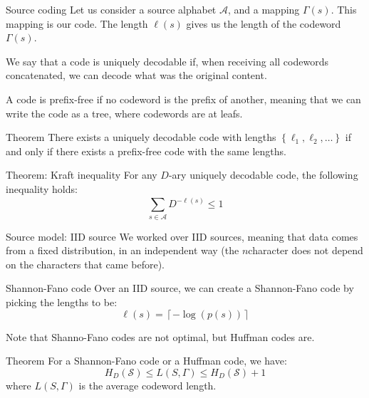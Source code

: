 \documentclass[a4paper]{article}
\begin{document}
\begin{parag}{Source coding}
    Let us consider a source alphabet $\mathcal{A}$, and a mapping $\Gamma\left(s\right)$. This mapping is our code. The length $\ell\left(s\right)$ gives us the length of the codeword $\Gamma\left(s\right)$.
    
    We say that a code is uniquely decodable if, when receiving all codewords concatenated, we can decode what was the original content. 

    A code is prefix-free if no codeword is the prefix of another, meaning that we can write the code as a tree, where codewords are at leafs.
\end{parag}

\begin{parag}{Theorem}
    There exists a uniquely decodable code with lengths $\left\{\ell_1, \ell_2, \ldots\right\}$ if and only if there exists a prefix-free code with the same lengths.
\end{parag}

\begin{parag}{Theorem: Kraft inequality}
    For any $D$-ary uniquely decodable code, the following inequality holds: 
    \[\sum_{s \in \mathcal{A}}^{} D^{-\ell\left(s\right)} \leq 1\]
\end{parag}

\begin{parag}{Source model: IID source}
    We worked over IID sources, meaning that data comes from a fixed distribution, in an independent way (the $n$\Th character does not depend on the characters that came before).

\end{parag}

\begin{parag}{Shannon-Fano code}
    Over an IID source, we can create a Shannon-Fano code by picking the lengths to be:
    \[\ell \left(s\right) = \left\lceil -\log\left(p\left(s\right)\right) \right\rceil \]
    
    Note that Shanno-Fano codes are not optimal, but Huffman codes are.
\end{parag}


\begin{parag}{Theorem}
    For a Shannon-Fano code or a Huffman code, we have: 
    \[H_D\left(\mathcal{S}\right) \leq L\left(S, \Gamma\right) \leq H_D\left(\mathcal{S}\right) + 1\]
    where $L\left(S, \Gamma\right)$ is the average codeword length.
\end{parag}
\end{document}
